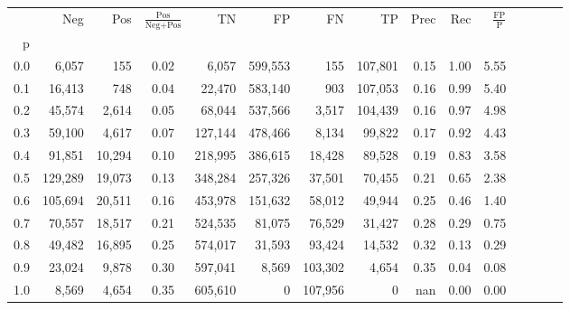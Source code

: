 \begin{tabular}{rrrcrrrrrrrrrrr}
\toprule
{} &      Neg &     Pos & $\frac{\text{Pos}}{\text{Neg}+\text{Pos}}$ &       TN &       FP &       FN &       TP &  Prec &   Rec & $\frac{\text{FP}}{\text{P}}$ \\
p   &          &         &                                            &          &          &          &          &       &       &                              \\
\midrule
0.0 &    6,057 &     155 &                                       0.02 &    6,057 &  599,553 &      155 &  107,801 &  0.15 &  1.00 &                         5.55 \\
0.1 &   16,413 &     748 &                                       0.04 &   22,470 &  583,140 &      903 &  107,053 &  0.16 &  0.99 &                         5.40 \\
0.2 &   45,574 &   2,614 &                                       0.05 &   68,044 &  537,566 &    3,517 &  104,439 &  0.16 &  0.97 &                         4.98 \\
0.3 &   59,100 &   4,617 &                                       0.07 &  127,144 &  478,466 &    8,134 &   99,822 &  0.17 &  0.92 &                         4.43 \\
0.4 &   91,851 &  10,294 &                                       0.10 &  218,995 &  386,615 &   18,428 &   89,528 &  0.19 &  0.83 &                         3.58 \\
0.5 &  129,289 &  19,073 &                                       0.13 &  348,284 &  257,326 &   37,501 &   70,455 &  0.21 &  0.65 &                         2.38 \\
0.6 &  105,694 &  20,511 &                                       0.16 &  453,978 &  151,632 &   58,012 &   49,944 &  0.25 &  0.46 &                         1.40 \\
0.7 &   70,557 &  18,517 &                                       0.21 &  524,535 &   81,075 &   76,529 &   31,427 &  0.28 &  0.29 &                         0.75 \\
0.8 &   49,482 &  16,895 &                                       0.25 &  574,017 &   31,593 &   93,424 &   14,532 &  0.32 &  0.13 &                         0.29 \\
0.9 &   23,024 &   9,878 &                                       0.30 &  597,041 &    8,569 &  103,302 &    4,654 &  0.35 &  0.04 &                         0.08 \\
1.0 &    8,569 &   4,654 &                                       0.35 &  605,610 &        0 &  107,956 &        0 &   nan &  0.00 &                         0.00 \\
\bottomrule
\end{tabular}
